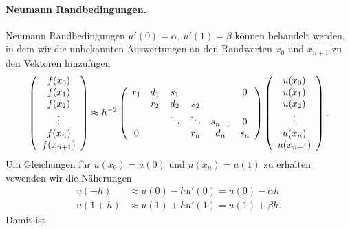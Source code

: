 \documentclass[12pt,a4paper]{book}
\theoremstyle{break}
\theoremstyle{nonumberplain}
\newcommand{\1}{\mathbbm{1}} 			      	%
\begin{document}
\paragraph{Neumann Randbedingungen.} 
Neumann Randbedingungen $u'(0)=\alpha$, $u'(1)=\beta$ können behandelt werden, in dem 
wir die unbekannten Auswertungen an den Randwerten $x_0$ und $x_{n+1}$ zu den Vektoren hinzufügen
\[
\left( \begin{array}{c} f(x_0)\\ f(x_1)\\ f(x_2)\\ \vdots \\ f(x_{n})\\ f(x_{n+1}) \end{array}\right)
\approx h^{-2} \left( \begin{array}{c c c c c c} r_1 & d_1 & s_1 &  & & 0\\ & r_2 & d_2 & s_2 \\ & & \ddots & \ddots & s_{n-1} & 0\\ 0 &  &  & r_{n} & d_{n} & s_{n}\end{array}\right) 
\left( \begin{array}{c} u(x_0) \\ u(x_1)\\ u(x_2)\\ \vdots \\ u(x_{n}) \\ u(x_{n+1})\end{array}\right).
\]
Um Gleichungen für $u(x_0)=u(0)$ und $u(x_n)=u(1)$ zu erhalten vewenden wir die Näherungen
\begin{align*}
u(-h) & \approx u(0)-hu'(0)=u(0)-\alpha h\\
u(1+h) & \approx u(1)+hu'(1)=u(1)+ \beta h.
\end{align*}
Damit ist
\end{document}
